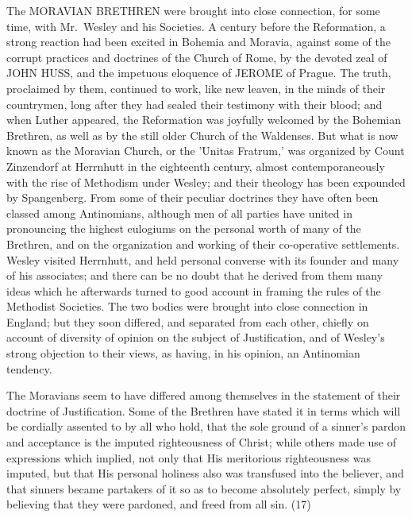 \documentclass[
]{book}
\begin{document}
The MORAVIAN BRETHREN were brought into close connection, for some time, with Mr.~Wesley and his Societies. A century before the Reformation, a strong reaction had been excited in Bohemia and Moravia, against some of the corrupt practices and doctrines of the Church of Rome, by the devoted zeal of JOHN HUSS, and the impetuous eloquence of JEROME of Prague. The truth, proclaimed by them, continued to work, like new leaven, in the minds of their countrymen, long after they had sealed their testimony with their blood; and when Luther appeared, the Reformation was joyfully welcomed by the Bohemian Brethren, as well as by the still older Church of the Waldenses. But what is now known as the Moravian Church, or the 'Unitas Fratrum,' was organized by Count Zinzendorf at Herrnhutt in the eighteenth century, almost contemporaneously with the rise of Methodism under Wesley; and their theology has been expounded by Spangenberg. From some of their peculiar doctrines they have often been classed among Antinomians, although men of all parties have united in pronouncing the highest eulogiums on the personal worth of many of the Brethren, and on the organization and working of their co-operative settlements. Wesley visited Herrnhutt, and held personal converse with its founder and many of his associates; and there can be no doubt that he derived from them many ideas which he afterwards turned to good account in framing the rules of the Methodist Societies. The two bodies were brought into close connection in England; but they soon differed, and separated from each other, chiefly on account of diversity of opinion on the subject of Justification, and of Wesley's strong objection to their views, as having, in his opinion, an Antinomian tendency.

The Moravians seem to have differed among themselves in the statement of their doctrine of Justification. Some of the Brethren have stated it in terms which will be cordially assented to by all who hold, that the sole ground of a sinner's pardon and acceptance is the imputed righteousness of Christ; while others made use of expressions which implied, not only that His meritorious righteousness was imputed, but that His personal holiness also was transfused into the believer, and that sinners became partakers of it so as to become absolutely perfect, simply by believing that they were pardoned, and freed from all sin. (17)
\end{document}
